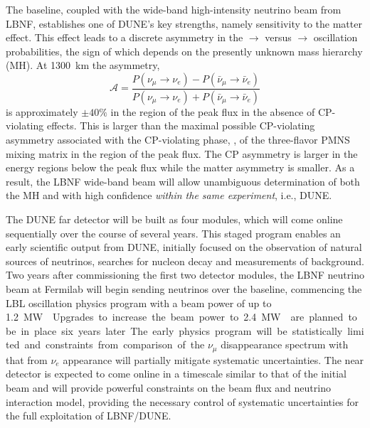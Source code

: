 The  baseline, coupled with the wide-band
high-intensity neutrino beam from LBNF, establishes one of DUNE's key
strengths, namely sensitivity to the matter effect. This effect leads to a
discrete asymmetry in the \numu $\to$ \nue versus \anumu $\to$ \anue
oscillation probabilities, the sign of which depends on the presently
unknown mass hierarchy (MH).  At \SI{1300}{\km} the asymmetry,
\begin{equation}
\mathcal{A} = \frac{ P(\nu_\mu \rightarrow \nu_e)-P(\bar{\nu}_\mu \rightarrow \bar{\nu}_e)}{P(\nu_\mu \rightarrow \nu_e)+P(\bar{\nu}_\mu \rightarrow \bar{\nu}_e)}
\end{equation}
is approximately $\pm 40\%$ in the region of the peak flux in the
absence of CP-violating effects. This is larger than the maximal
possible CP-violating asymmetry associated with the CP-violating
phase, \deltacp, of the three-flavor PMNS mixing matrix in the region of
the peak flux. The CP asymmetry is larger in the energy regions below the peak
flux while the matter asymmetry is smaller. As a result, the LBNF
wide-band beam will allow unambiguous determination of both the MH and
\deltacp with high confidence \textit{within the same experiment}, i.e., DUNE.   

The DUNE far detector will be built as four  modules, which will
come online sequentially over the course of several years. 
This staged program enables an early scientific output from DUNE, 
initially focused on the observation of natural
sources of neutrinos, searches for nucleon decay and 
measurements of background. 
Two years after commissioning the first two detector modules, 
the LBNF neutrino
beam at Fermilab will  
begin sending neutrinos over the 
baseline, commencing the LBL oscillation physics program with a beam power of up to \SI{1.2}\MW{}. Upgrades to increase the beam power to \SI{2.4}\MW{} are planned to be in place six years later.
The early physics program
will be statistically limited and constraints from comparison of the $\nu_\mu$
disappearance spectrum with that from $\nu_e$ appearance will partially mitigate systematic uncertainties. The near detector is expected to come online in a timescale similar to that of the initial beam and will provide powerful constraints on the beam flux and neutrino interaction model, providing the
necessary control of systematic uncertainties for the full exploitation of LBNF/DUNE. 


